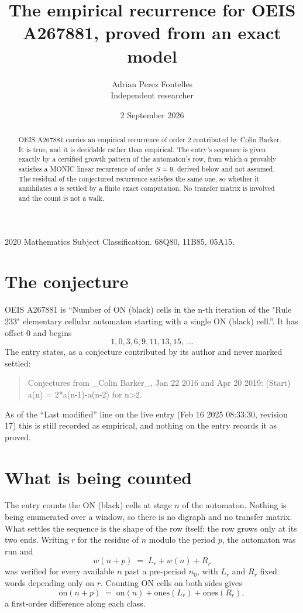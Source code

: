 \documentclass[11pt,a4paper]{article}
\title{The empirical recurrence for OEIS A267881, proved from an exact model}
\author{Adrian Perez Fontelles\\ \small Independent researcher}
\date{2 September 2026}
\theoremstyle{plain}
\theoremstyle{definition}
\begin{document}
\maketitle

\begin{abstract}
OEIS A267881 carries an empirical recurrence of order $2$ contributed by Colin Barker. It is true, and it is
decidable rather than empirical. The entry's sequence is given exactly by a certified growth pattern of the automaton's row, from
which $a$ provably satisfies a MONIC linear recurrence of order $S=9$, derived below and not
assumed. The residual of the conjectured recurrence satisfies the same one, so whether it
annihilates $a$ is settled by a finite exact computation. No transfer matrix is involved and
the count is not a walk.
\end{abstract}

\noindent\small 2020 Mathematics Subject Classification. 68Q80, 11B85, 05A15.\normalsize

\section{The conjecture}

OEIS A267881 is ``Number of ON (black) cells in the n-th iteration of the "Rule 233" elementary cellular automaton starting with a single ON (black) cell.''. It has offset $0$ and begins
\[
1, 0, 3, 6, 9, 11, 13, 15,\ \dots
\]
The entry states, as a conjecture contributed by its author and never marked settled:
\begin{quote}
Conjectures from \_Colin Barker\_, Jan 22 2016 and Apr 20 2019: (Start) a(n) = 2*a(n-1)-a(n-2) for n>2.
\end{quote}
As of the ``Last modified'' line on the live entry (Feb 16 2025 08:33:30, revision 17)
this is still recorded as empirical, and nothing on the entry records it as proved.

\section{What is being counted}

The entry counts the ON (black) cells at stage $n$ of the automaton. Nothing is being enumerated over a window, so there is
no digraph and no transfer matrix. What settles the sequence is the shape of the row itself:
the row grows only at its two ends. Writing
$r$ for the residue of $n$ modulo the period $p$, the automaton was run and
\[
w(n+p)\;=\;L_r + w(n) + R_r
\]
was verified for every available $n$ past a
pre-period $n_0$, with $L_r$ and $R_r$ fixed words depending only on $r$. Counting ON cells on
both sides gives
\[
\mathrm{on}(n+p)\;=\;\mathrm{on}(n)+\mathrm{ones}(L_r)+\mathrm{ones}(R_r),
\]
a first-order difference along each class.
\end{document}
